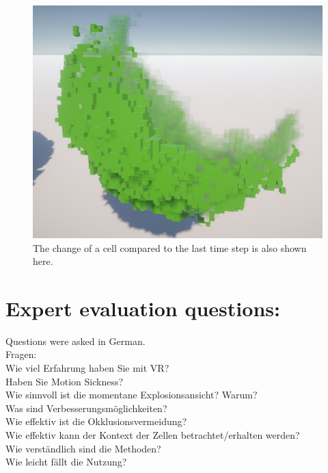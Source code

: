 \begin{figure}[h]
	\centering
	\includegraphics[width=1\linewidth]{fig/Images/ChangeOfCellTranparent}
	\caption[]{The change of a cell compared to the last time step is also shown here. }
	\label{fig:ChangeOfCellTranparent}
\end{figure}

\section{Expert evaluation questions:}
\label{ExpertQuestions}
Questions were asked in German. \\
Fragen: \\
Wie viel Erfahrung haben Sie mit VR? \\
Haben Sie Motion Sickness? \\
Wie sinnvoll ist die momentane Explosionsansicht? Warum? \\
Was sind Verbesserungsmöglichkeiten? \\
Wie effektiv ist die Okklusionsvermeidung? \\
Wie effektiv kann der Kontext der Zellen betrachtet/erhalten werden? \\
Wie verständlich sind die Methoden? \\
Wie leicht fällt die Nutzung? \\
